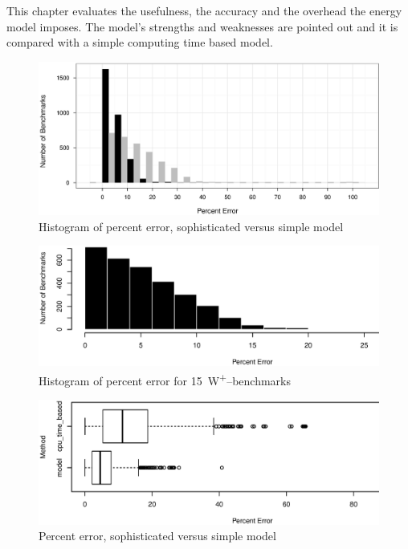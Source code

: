 \label{sec:evaluation}

This chapter evaluates the usefulness, the accuracy and the overhead the energy
model imposes. The model's strengths and weaknesses are pointed out and it is
compared with a simple computing time based model.


\label{sec:error}

\begin{figure}
  \centering
    \includegraphics[width=\textwidth]{fig/hist-models.eps}
  \caption{Histogram of percent error, sophisticated versus simple model}
  \label{fig:err-hist}
\end{figure}

\begin{figure}
  \centering
    \includegraphics[width=\textwidth]{fig/hist-model-15W.eps}
  \caption{Histogram of percent error for \SI{15}{\watt}\textsuperscript{+}--benchmarks}
  \label{fig:err-hist-15}
\end{figure}

\begin{figure}
  \centering
    \includegraphics[width=\textwidth]{fig/Ncpu-bench-errs.eps}
  \caption{Percent error, sophisticated versus simple model}
  \label{fig:errs-ncpu}
\end{figure}

